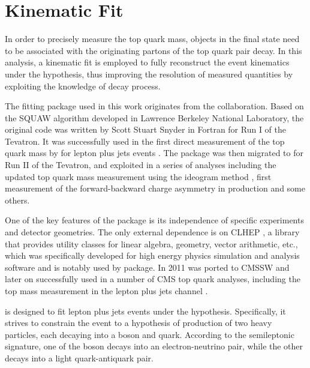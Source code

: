 \newpage
\section{Kinematic Fit}
\label{s_top_mass:kinematic_fit}

In order to precisely measure the top quark mass, objects in the final state need to be associated with the originating
partons of the top quark pair decay. In this analysis, a kinematic fit is employed to fully reconstruct the event
kinematics under the \ttbar hypothesis, thus improving the resolution of measured quantities by exploiting the knowledge
of decay process.

The \HitFit fitting package \autocite{HitFit} used in this work originates from the \Dzero collaboration. Based on the
SQUAW algorithm \autocite{SQUAW} developed in Lawrence Berkeley National Laboratory, the original \HitFit code was
written by Scott Stuart Snyder in Fortran for Run I of the Tevatron. It was successfully used in the first direct
measurement of the top quark mass by \Dzero for lepton plus jets \ttbar events \autocite{D0_top_mass_1998}. The package
was then migrated to \Cplusplus for Run II of the Tevatron, and exploited in a series of \ttbar analyses including the
updated top quark mass measurement using the ideogram method \autocite{D0_top_mass_ljets_ideogram}, first measurement of
the forward-backward charge asymmetry in \ttbar production \autocite{D0_charge_assymetry} and some others.

One of the key features of the \HitFit package is its independence of specific experiments and detector geometries. The
only external dependence is on \textsc{CLHEP} \autocite{CLHEP}, a \Cplusplus library that provides utility classes for
linear algebra, geometry, vector arithmetic, etc., which was specifically developed for high energy physics simulation
and analysis software and is notably used by \GEANTfour package. In 2011 \HitFit was ported to CMSSW and later on
successfully used in a number of CMS top quark analyses, including the top mass measurement in the lepton plus jets
channel \autocite{top_mass_ljets_CMS}.

\HitFit is designed to fit lepton plus jets events under the \ttbar hypothesis. Specifically, it strives to constrain
the event to a hypothesis of production of two heavy particles, each decaying into a \W boson and \cPqb quark. According
to the semileptonic signature, one of the \W boson decays into an electron-neutrino pair, while the other decays into a
light quark-antiquark pair.

